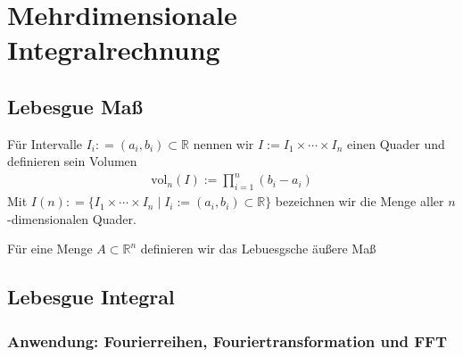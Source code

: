 
\section{Mehrdimensionale Integralrechnung}

\subsection{Lebesgue Maß}
Für Intervalle $I_i : = (a_i,b_i) \subset \mathbb{R}$ nennen wir $I := I_1 \times \cdots \times I_n$ einen Quader und definieren sein Volumen
\begin{align*}
\text{vol}_n (I):=   \prod_{i = 1}^n (b_i -a_i)  
\end{align*}
Mit $I(n): = \{   I_1 \times \cdots \times I_n  \; | \;  I_i := (a_i, b_i) \subset \mathbb{R} \}$ bezeichnen wir die Menge aller $n$-dimensionalen Quader. 
\begin{Definition}
Für eine Menge $A \subset \mathbb{R}^n$ definieren wir das Lebuesgsche äußere Maß
\end{Definition}
\subsection{Lebesgue Integral}

\subsubsection*{Anwendung: Fourierreihen, Fouriertransformation und FFT} 